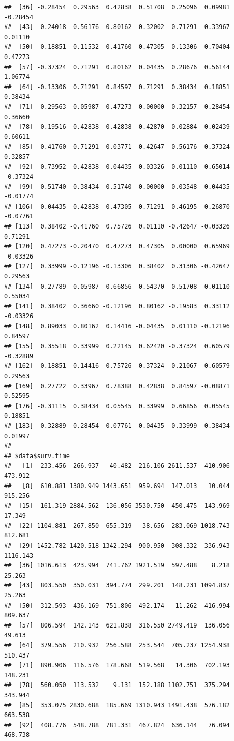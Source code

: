 \documentclass{article}\usepackage[]{graphicx}\usepackage[]{color}
\makeatletter
\newenvironment{kframe}{%
 \def\at@end@of@kframe{}%
 \ifinner\ifhmode%
  \def\at@end@of@kframe{\end{minipage}}%
  \begin{minipage}{\columnwidth}%
 \fi\fi%
 \def\FrameCommand##1{\hskip\@totalleftmargin \hskip-\fboxsep
 \colorbox{shadecolor}{##1}\hskip-\fboxsep
     \hskip-\linewidth \hskip-\@totalleftmargin \hskip\columnwidth}%
 \MakeFramed {\advance\hsize-\width
   \@totalleftmargin\z@ \linewidth\hsize
   \@setminipage}}%
 {\par\unskip\endMakeFramed%
 \at@end@of@kframe}
\newenvironment{knitrout}{}{} %
\makeatother
\begin{document}
\begin{knitrout}
\begin{kframe}
\begin{verbatim}
##  [36] -0.28454  0.29563  0.42838  0.51708  0.25096  0.09981 -0.28454
##  [43] -0.24018  0.56176  0.80162 -0.32002  0.71291  0.33967  0.01110
##  [50]  0.18851 -0.11532 -0.41760  0.47305  0.13306  0.70404  0.47273
##  [57] -0.37324  0.71291  0.80162  0.04435  0.28676  0.56144  1.06774
##  [64] -0.13306  0.71291  0.84597  0.71291  0.38434  0.18851  0.38434
##  [71]  0.29563 -0.05987  0.47273  0.00000  0.32157 -0.28454  0.36660
##  [78]  0.19516  0.42838  0.42838  0.42870  0.02884 -0.02439  0.60611
##  [85] -0.41760  0.71291  0.03771 -0.42647  0.56176 -0.37324  0.32857
##  [92]  0.73952  0.42838  0.04435 -0.03326  0.01110  0.65014 -0.37324
##  [99]  0.51740  0.38434  0.51740  0.00000 -0.03548  0.04435 -0.01774
## [106] -0.04435  0.42838  0.47305  0.71291 -0.46195  0.26870 -0.07761
## [113]  0.38402 -0.41760  0.75726  0.01110 -0.42647 -0.03326  0.71291
## [120]  0.47273 -0.20470  0.47273  0.47305  0.00000  0.65969 -0.03326
## [127]  0.33999 -0.12196 -0.13306  0.38402  0.31306 -0.42647  0.29563
## [134]  0.27789 -0.05987  0.66856  0.54370  0.51708  0.01110  0.55034
## [141]  0.38402  0.36660 -0.12196  0.80162 -0.19583  0.33112 -0.03326
## [148]  0.89033  0.80162  0.14416 -0.04435  0.01110 -0.12196  0.84597
## [155]  0.35518  0.33999  0.22145  0.62420 -0.37324  0.60579 -0.32889
## [162]  0.18851  0.14416  0.75726 -0.37324 -0.21067  0.60579  0.29563
## [169]  0.27722  0.33967  0.78388  0.42838  0.84597 -0.08871  0.52595
## [176] -0.31115  0.38434  0.05545  0.33999  0.66856  0.05545  0.18851
## [183] -0.32889 -0.28454 -0.07761 -0.04435  0.33999  0.38434  0.01997
## 
## $data$surv.time
##   [1]  233.456  266.937   40.482  216.106 2611.537  410.906  473.912
##   [8]  610.881 1380.949 1443.651  959.694  147.013   10.044  915.256
##  [15]  161.319 2884.562  136.056 3530.750  450.475  143.969   17.349
##  [22] 1104.881  267.850  655.319   38.656  283.069 1018.743  812.681
##  [29] 1452.782 1420.518 1342.294  900.950  308.332  336.943 1116.143
##  [36] 1016.613  423.994  741.762 1921.519  597.488    8.218   25.263
##  [43]  803.550  350.031  394.774  299.201  148.231 1094.837   25.263
##  [50]  312.593  436.169  751.806  492.174   11.262  416.994  809.637
##  [57]  806.594  142.143  621.838  316.550 2749.419  136.056   49.613
##  [64]  379.556  210.932  256.588  253.544  705.237 1254.938  510.437
##  [71]  890.906  116.576  178.668  519.568   14.306  702.193  148.231
##  [78]  560.050  113.532    9.131  152.188 1102.751  375.294  343.944
##  [85]  353.075 2830.688  185.669 1310.943 1491.438  576.182  663.538
##  [92]  408.776  548.788  781.331  467.824  636.144   76.094  468.738

\end{verbatim}
\end{kframe}
\end{knitrout}
\end{document}
